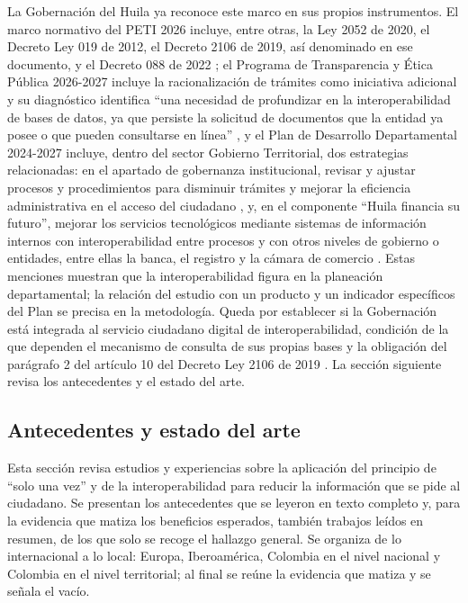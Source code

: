 La Gobernación del Huila ya reconoce este marco en sus propios instrumentos. El marco normativo del PETI 2026 incluye, entre otras, la Ley 2052 de 2020, el Decreto Ley 019 de 2012, el Decreto 2106 de 2019, así denominado en ese documento, y el Decreto 088 de 2022 \parencite[pp.~6-8]{gobernaciondelhuila2026peti}; el Programa de Transparencia y Ética Pública 2026-2027 incluye la racionalización de trámites como iniciativa adicional \parencite[p.~133]{gobernaciondelhuila2026ptep} y su diagnóstico identifica \enquote{una necesidad de profundizar en la interoperabilidad de bases de datos, ya que persiste la solicitud de documentos que la entidad ya posee o que pueden consultarse en línea} \parencite[p.~134]{gobernaciondelhuila2026ptep}, y el Plan de Desarrollo Departamental 2024-2027 incluye, dentro del sector Gobierno Territorial, dos estrategias relacionadas: en el apartado de gobernanza institucional, revisar y ajustar procesos y procedimientos para disminuir trámites y mejorar la eficiencia administrativa en el acceso del ciudadano \parencite[p.~187]{gobernaciondelhuila2024ordenanza}, y, en el componente \enquote{Huila financia su futuro}, mejorar los servicios tecnológicos mediante sistemas de información internos con interoperabilidad entre procesos y con otros niveles de gobierno o entidades, entre ellas la banca, el registro y la cámara de comercio \parencite[p.~190]{gobernaciondelhuila2024ordenanza}. Estas menciones muestran que la interoperabilidad figura en la planeación departamental; la relación del estudio con un producto y un indicador específicos del Plan se precisa en la metodología. Queda por establecer si la Gobernación está integrada al servicio ciudadano digital de interoperabilidad, condición de la que dependen el mecanismo de consulta de sus propias bases y la obligación del parágrafo 2 del artículo 10 del Decreto Ley 2106 de 2019 . La sección siguiente revisa los antecedentes y el estado del arte.

\subsection{Antecedentes y estado del arte}

Esta sección revisa estudios y experiencias sobre la aplicación del principio de \enquote{solo una vez} y de la interoperabilidad para reducir la información que se pide al ciudadano. Se presentan los antecedentes que se leyeron en texto completo y, para la evidencia que matiza los beneficios esperados, también trabajos leídos en resumen, de los que solo se recoge el hallazgo general. Se organiza de lo internacional a lo local: Europa, Iberoamérica, Colombia en el nivel nacional y Colombia en el nivel territorial; al final se reúne la evidencia que matiza y se señala el vacío.

